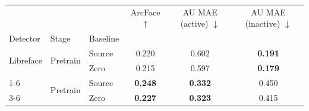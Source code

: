 \begin{tabular}{lllccc}
\toprule
 &  &  & ArcFace $\uparrow$ & AU MAE (active) $\downarrow$ & AU MAE (inactive) $\downarrow$ \\
Detector & Stage & Baseline &  &  &  \\
\midrule
\multirow[t]{2}{*}{Libreface} & \multirow[t]{2}{*}{Pretrain} & Source & 0.220 & 0.602 & \textbf{0.191} \\
\cmidrule{3-6}
 &  & Zero & 0.215 & 0.597 & \textbf{0.179} \\
\cmidrule{1-6}
\multirow[t]{2}{*}{Pyfeat} & \multirow[t]{2}{*}{Pretrain} & Source & \textbf{0.248} & \textbf{0.332} & 0.450 \\
\cmidrule{3-6}
 &  & Zero & \textbf{0.227} & \textbf{0.323} & 0.415 \\
\bottomrule
\end{tabular}